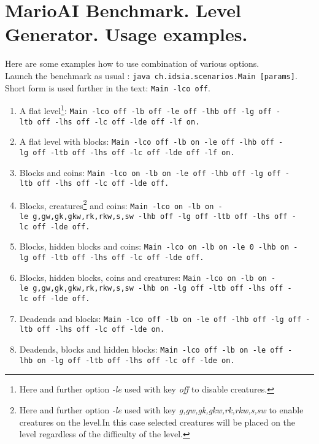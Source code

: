 \documentclass{report}
\begin{document}
\section*{MarioAI Benchmark. Level Generator. Usage examples.}
Here are some examples how to use combination of various options. \\
Launch the benchmark as usual : \texttt{java~ch.idsia.scenarios.Main [params]}. \\ Short form is used further in the text: \texttt{Main -lco off}.
\begin{enumerate}
\item A flat level\footnote{Here and further option \emph{-le} used with key \emph{off} to disable creatures.}: \newline %
\texttt{Main~-lco~off~-lb~off~-le~off~-lhb~off~-lg~off~-ltb~off~-lhs~off~-lc~off~-lde~off~-lf~on.}
\item A flat level with blocks:\newline %
\texttt{Main~-lco~off~-lb~on~-le~off~-lhb~off~-lg~off~-ltb~off~-lhs~off~-lc~off~-lde~off~-lf~on.}
\item Blocks and coins:\newline %
\texttt{Main~-lco~on~-lb~on~-le~off~-lhb~off~-lg~off~-ltb~off~-lhs~off~-lc~off~-lde~off.}
\item Blocks, creatures\footnote{Here and further option \emph{-le} used with key \emph{g,gw,gk,gkw,rk,rkw,s,sw} to enable creatures on the level.In this case selected creatures will be placed on the level regardless of the difficulty of the level.} and coins:\newline %
\texttt{Main~-lco~on~-lb~on~-le~g,gw,gk,gkw,rk,rkw,s,sw~-lhb~off~-lg~off~-ltb~off~-lhs~off~-lc~off~-lde~off.}
\item Blocks, hidden blocks and coins:\newline %
\texttt{Main~-lco~on~-lb~on~-le~0~-lhb~on~-lg~off~-ltb~off~-lhs~off~-lc~off~-lde~off.}
\item Blocks, hidden blocks, coins and creatures:\newline %
\texttt{Main~-lco~on~-lb~on~-le~g,gw,gk,gkw,rk,rkw,s,sw~-lhb~on~-lg~off~-ltb~off~-lhs~off~-lc~off~-lde~off.}
\item Deadends  and blocks:\newline %
\texttt{Main~-lco~off~-lb~on~-le~off~-lhb~off~-lg~off~-ltb~off~-lhs~off~-lc~off~-lde~on.}
\item Deadends, blocks and hidden blocks:\newline %
\texttt{Main~-lco~off~-lb~on~-le~off~-lhb~on~-lg~off~-ltb~off~-lhs~off~-lc~off~-lde~on.}

\end{enumerate}
\end{document}
